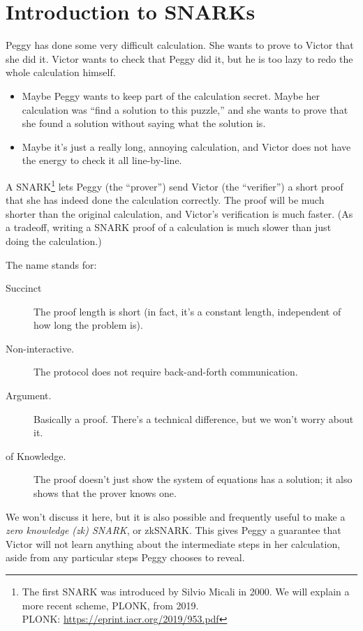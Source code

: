 \section{Introduction to SNARKs}
Peggy has done some very difficult calculation. She wants to prove to
Victor that she did it. Victor wants to check that Peggy did it, but he
is too lazy to redo the whole calculation himself.

\begin{itemize}
\item Maybe Peggy wants to keep part of the calculation secret. Maybe her
  calculation was ``find a solution to this puzzle,'' and she wants to
  prove that she found a solution without saying what the solution is.
\item Maybe it's just a really long, annoying calculation, and Victor does
  not have the energy to check it all line-by-line.
\end{itemize}

A \alert{SNARK}\footnote{The first SNARK was introduced by Silvio Micali in 2000.
We will explain a more recent scheme, PLONK, from 2019. \\
PLONK: \url{https://eprint.iacr.org/2019/953.pdf}}
 lets Peggy (the ``prover'') send Victor (the ``verifier'')
a short proof that she has indeed done the calculation correctly.
The proof will be much shorter than the original calculation,
and Victor's verification is much faster.
(As a tradeoff, writing a
SNARK proof of a calculation is much slower than just doing the
calculation.)

The name stands for:
\begin{description}
\item[Succinct] The proof length is short (in fact, it's a constant
  length, independent of how long the problem is).
\item[Non-interactive.] The protocol does not require back-and-forth
  communication.
\item[Argument.] Basically a proof. There's a technical difference,
  but we won't worry about it.
\item[of Knowledge.] The proof doesn't just show the system of
  equations has a solution; it also shows that the prover knows one.
\end{description}

We won't discuss it here, but it is also possible and frequently
useful to make a \emph{zero knowledge (zk) SNARK}, or \alert{zkSNARK}.
This gives Peggy a guarantee that Victor will not
learn anything about the intermediate steps in her calculation, aside
from any particular steps Peggy chooses to reveal.

